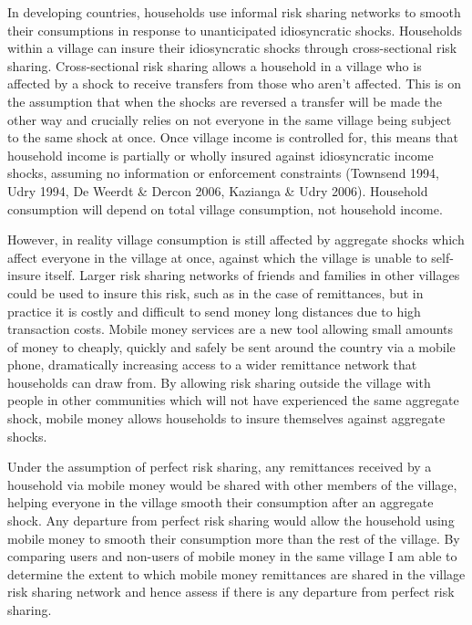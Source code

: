 In developing countries, households use informal risk sharing networks to smooth their consumptions in response to unanticipated idiosyncratic shocks. Households within a village can insure their idiosyncratic shocks through  cross-sectional risk sharing. Cross-sectional risk sharing allows a household in a village who is affected by a shock to receive transfers from those who aren't affected. This is on the assumption that when the shocks are reversed a transfer will be made the other way and crucially relies on not everyone in the same village being subject to the same shock at once. Once village income is controlled for, this means that household income is partially or wholly insured against idiosyncratic income shocks, assuming no information or enforcement constraints (Townsend 1994, Udry 1994, De Weerdt \& Dercon 2006, Kazianga \& Udry 2006). Household consumption will depend on total village consumption, not household income. 

However, in reality village consumption is still affected by aggregate shocks which affect everyone in the village at once, against which the village is unable to self-insure itself. Larger risk sharing networks of friends and families in other villages could be used to insure this risk, such as in the case of remittances, but in practice it is costly and difficult to send money long distances due to high transaction costs. Mobile money services are a new tool allowing small amounts of money to cheaply, quickly and safely be sent around the country via a mobile phone, dramatically increasing access to a wider remittance network that households can draw from. By allowing risk sharing outside the village with people in other communities which will not have experienced the same aggregate shock, mobile money allows households to insure themselves against aggregate shocks.   

Under the assumption of perfect risk sharing, any remittances received by a household via mobile money would be shared with other members of the village, helping everyone in the village smooth their consumption after an aggregate shock. Any departure from perfect risk sharing would allow the household using mobile money to smooth their consumption more than the rest of the village. By comparing users and non-users of mobile money in the same village I am able to determine the extent to which mobile money remittances are shared in the village risk sharing network and hence assess if there is any departure from perfect risk sharing.    

